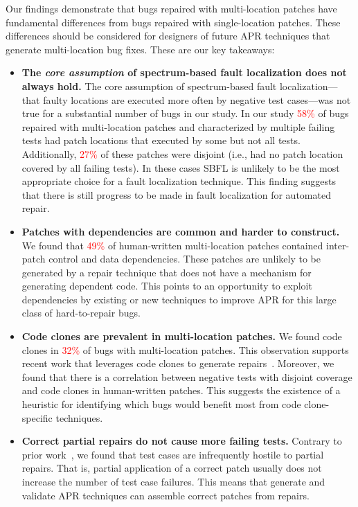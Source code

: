\documentclass[10pt, conference]{IEEEtran}
\newcommand\todo[1]{\textcolor{red}{#1}}
\begin{document}
Our findings demonstrate that bugs repaired with multi-location patches have
fundamental differences from bugs repaired with single-location patches. These
differences should be considered for designers of future APR techniques that
generate multi-location bug fixes. These are our key takeaways:

\begin{itemize}[wide, labelindent=0pt]
\item \textbf{The \emph{core assumption} of spectrum-based fault
  localization does not always hold.}
The core assumption of spectrum-based fault localization---that faulty locations
are executed more often by negative test cases---was not true for a substantial
number of bugs in our study. In our study \todo{58\%} of bugs repaired with
multi-location patches and characterized by multiple failing tests had patch
locations that executed by some but not all tests. Additionally, \todo{27\%} of
these patches were disjoint (i.e., had no patch location covered by all failing
tests).  In these cases SBFL is unlikely to be the most appropriate choice for a
fault localization technique. This finding suggests that there is still progress
to be made in fault localization for automated repair.

\item \textbf{Patches with dependencies are common and harder to construct.}
We found that \todo{49\%} of human-written multi-location patches contained
inter-patch control and data dependencies. These patches are unlikely to be
generated by a repair technique that does not have a mechanism for generating
dependent code. This points to an opportunity to exploit dependencies by
existing or new techniques to improve APR for this large class of hard-to-repair
bugs.

\item\textbf{Code clones are prevalent in multi-location patches.}
We found code clones in \todo{32\%} of bugs with multi-location
patches. This observation supports recent work that leverages code clones to
generate repairs~\cite{saha2019harnessing}. Moreover, we found that there is a
correlation between negative tests with disjoint coverage and code clones in
human-written patches. This suggests the existence of a heuristic for
identifying which bugs would benefit most from code clone-specific techniques.

\item\textbf{Correct partial repairs do not cause more failing tests.}
Contrary to prior work~\cite{gecco09}, we found that test cases are infrequently
hostile to partial repairs. That is, partial application of a correct patch
usually does not increase the number of test case failures. This means that
generate and validate APR techniques can assemble correct patches from repairs.


\end{itemize}
\end{document}
